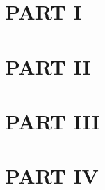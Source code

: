 \part{PART I} %




\ctparttext{\blindtext} %

\part{PART II} %


\cleardoublepage %



\ctparttext{\blindtext} %

\part{PART III} %




\ctparttext{\blindtext} %

\part{PART IV} %

